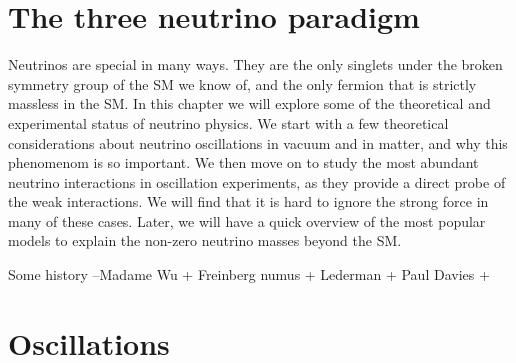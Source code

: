 \graphicspath{{}{theory/}{Diagrams/}}


\section{The three neutrino paradigm}

Neutrinos are special in many ways. They are the only singlets under the broken symmetry group of the SM we know of, and the only fermion that is strictly massless in the SM. In this chapter we will explore some of the theoretical and experimental status of neutrino physics. We start with a few theoretical considerations about neutrino oscillations in vacuum and in matter, and why this phenomenom is so important. We then move on to study the most abundant neutrino interactions in oscillation experiments, as they provide a direct probe of the weak interactions. We will find that it is hard to ignore the strong force in many of these cases. Later, we will have a quick overview of the most popular models to explain the non-zero neutrino masses beyond the SM. 

Some history --Madame Wu + Freinberg numus + Lederman + Paul Davies + 

\section{Oscillations}

